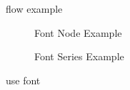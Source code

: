 


\begin{figure}
    
    \caption{flow example}
\end{figure}

\begin{figure}
    \begin{subfigure}{0.48\linewidth}
        
        \caption{Font Node Example}
    \end{subfigure}
    \begin{subfigure}{0.48\linewidth}
        
        \caption{Font Series Example}
    \end{subfigure}
    \caption{use font}
\end{figure}